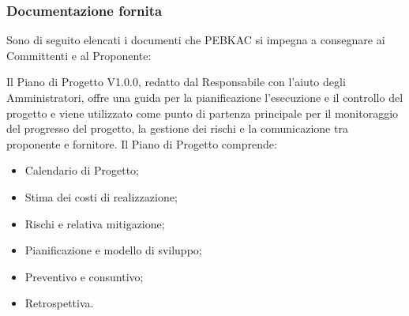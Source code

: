 \subsubsection{Documentazione fornita}
Sono di seguito elencati i documenti che PEBKAC si impegna a consegnare ai Committenti e al Proponente: 

Il Piano di Progetto V1.0.0, redatto dal Responsabile con l'aiuto degli Amministratori, offre una guida per la pianificazione l'esecuzione e il controllo del progetto e viene utilizzato come punto di partenza principale per il monitoraggio del progresso del progetto, la gestione dei rischi e la comunicazione tra proponente e fornitore.
Il Piano di Progetto comprende:
    \begin{itemize}
        \item Calendario di Progetto;
        \item Stima dei costi di realizzazione;
        \item Rischi e relativa mitigazione;
        \item Pianificazione e modello di sviluppo;
        \item Preventivo e consuntivo;
        \item Retrospettiva.
    \end{itemize}

